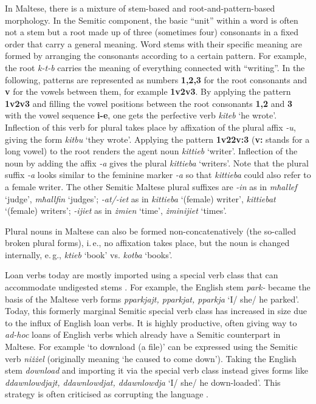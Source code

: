 \documentclass[]{../../metanetpaper}
\begin{document}
\begin{multicols}{2}
In Maltese, there is a mixture of stem-based and root-and-pattern-based morphology. In the Semitic component, the basic ``unit'' within a word is often not a stem but a root made up of three (sometimes four) consonants in a fixed order that carry a general meaning. Word stems with their specific meaning are formed by arranging the consonants according to a certain pattern. For example, the root \emph{k-t-b} carries the meaning of everything connected with ``writing''. In the following, patterns are represented as numbers \textbf{1,2,3} for the root consonants and \textbf{v} for the vowels between them, for example \textbf{1v2v3}. By applying the pattern \textbf{1v2v3} and filling the vowel positions between the root consonants \textbf{1,2} and \textbf{3} with the vowel sequence \textbf{i-e}, one gets the perfective verb \emph{kiteb} `he wrote'. Inflection of this verb for plural takes place by affixation of the plural affix \emph{-u}, giving the form \emph{kitbu} `they wrote'. Applying the pattern \textbf{1v22v:3} (\textbf{v:} stands for a long vowel) to the root renders the agent noun \emph{kittieb} `writer'. Inflection of the noun by adding the affix \emph{-a} gives the plural \emph{kittieba} `writers'. Note that the plural suffix \emph{-a} looks similar to the feminine marker \emph{-a} so that \emph{kittieba} could also refer to a female writer. The other Semitic Maltese plural suffixes are \emph{-in} as in \emph{mħallef} `judge', \emph{mħallfin} `judges'; \emph{-at/-iet} as in \emph{kittieba} `(female) writer', \emph{kittiebat} `(female) writers'; \emph{-ijiet} as in \emph{żmien} `time', \emph{żminijiet} `times'.

Plural nouns in Maltese can also be formed non-concatenatively (the so-called broken plural forms), i.\,e., no affixation takes place, but the noun is changed internally, e.\,g., \emph{ktieb} `book' vs. \emph{kotba} `books'.

Loan verbs today are mostly imported using a special verb class that can accommodate undigested stems \cite{Mifsud:1995}. For example, the English stem \emph{park-} became the basis of the Maltese verb forms \emph{pparkjajt, pparkjat, pparkja} `I/ she/ he parked'. Today, this formerly marginal Semitic special verb class has increased in size due to the influx of English loan verbs. It is highly productive, often giving way to \emph{ad-hoc} loans of English verbs which already have a Semitic counterpart in Maltese. For example `to download (a file)' can be expressed using the Semitic verb \emph{niżżel} (originally meaning `he caused to come down'). Taking the English stem \emph{download} and importing it via the special verb class instead gives forms like \emph{ddawnlowdjajt, ddawnlowdjat, ddawnlowdja} `I/ she/ he down-loaded'. This strategy is often criticised as corrupting the language \cite{Fabri:2011a}.


\end{multicols}
\end{document}
